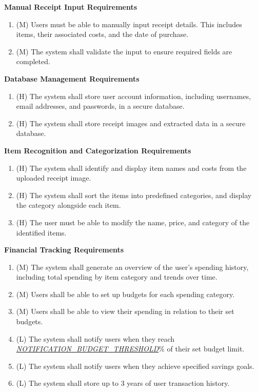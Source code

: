 \documentclass[12pt]{article}
\begin{document}
\textbf{Manual Receipt Input Requirements}\label{FR-MIS}
\begin{enumerate}[label=FR-MIS-\arabic*]
  \item (M) Users must be able to manually input receipt details. This includes
  items, their associated costs, and the date of purchase.
  \item (M) The system shall validate the input to ensure required fields are
  completed.
  \end{enumerate}

\textbf{Database Management Requirements}\label{FR-DM}
\begin{enumerate}[label=FR-DM-\arabic*]
  \item (H) The system shall store user account information, including usernames,
  email addresses, and passwords, in a secure database.
  \item (H) The system shall store receipt images and extracted data in a secure database.
\end{enumerate}

\textbf{Item Recognition and Categorization Requirements}\label{FR-RS}
\begin{enumerate}[label=FR-RS-\arabic*]
  \item (H) The system shall identify and display item names and costs from the
  uploaded receipt image.
  \item (H) The system shall sort the items into predefined categories, and
  display the category alongside each item.
  \item (H) The user must be able to modify the name, price, and category of the
  identified items.   
\end{enumerate}

\textbf{Financial Tracking Requirements}\label{FR-FT}
\begin{enumerate}[label=FR-FT-\arabic*]
  \item (M) The system shall generate an overview of the user's spending history,
  including total spending by item category and trends over time.
  \item (M) Users shall be able to set up budgets for each spending category.
  \item (M) Users shall be able to view their spending in relation to their set
  budgets.
  \item (L) The system shall notify users when they reach
  \hyperref[Table:AuxConstants]{\textit{NOTIFICATION\_BUDGET\_THRESHOLD}}\%
  of their set budget limit.
  \item (L) The system shall notify users when they achieve specified savings goals.
  \item (L) The system shall store up to 3 years of user transaction history.
\end{enumerate}
\end{document}

